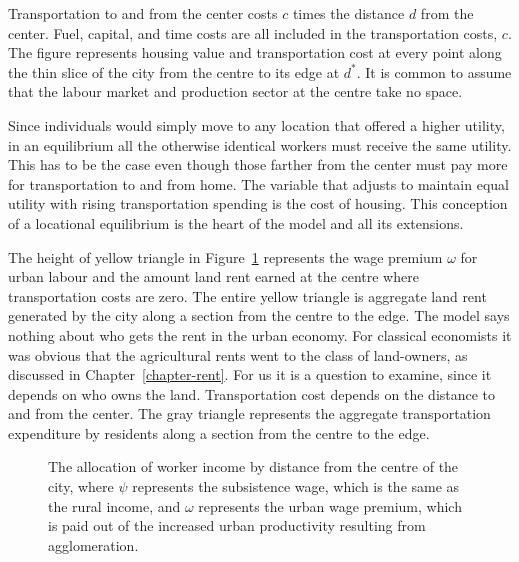 Transportation to and from the center costs ${c}$ times the distance $d$ from the center. Fuel, capital, and time costs are  all included in the transportation costs, ${c}$. The figure represents housing value and transportation cost at every point along the thin slice of the city from the centre to its edge at $d^*$.  It is common to assume that the labour market and production sector at the centre take no space. 

 Since individuals would simply move to any location that offered a higher utility, in an equilibrium all the otherwise identical workers must receive the same utility. This has to be the case even though those farther from the center must pay more for transportation to and from home. The variable that  adjusts to maintain equal utility with rising transportation spending is the cost of housing. This conception of a \gls{locational equilibrium} is the heart of the model and all its extensions.

The height of yellow triangle in Figure~\ref{fig-alonso-simple} represents the wage premium $\omega$ for urban labour and the amount land rent earned at the centre %
where transportation costs are zero. The entire yellow triangle is aggregate land rent generated by the city along a section from the centre to the edge. The model says nothing about who gets the rent in the urban economy. For classical economists it was obvious that the agricultural rents went to the class of land-owners, as discussed in Chapter~\ref{chapter-rent}. For us it is a question to examine, since it depends on who owns the land.  Transportation cost depends on the distance  to and from the center.  The gray triangle represents the aggregate transportation expenditure by residents along a section from the centre to the edge.

\begin{figure}
    \begin{center}
    
    \caption[The allocation of worker income by distance from the centre of the city.]{The allocation of worker income by distance from the centre of the city, where $\psi$ represents the \gls{subsistence wage}, which is the same as the rural income, and $\omega$ represents the \gls{urban wage premium}, which is paid out of the increased urban productivity resulting from agglomeration.}
    \label{fig-alonso-simple}
    \end{center}
\end{figure}

